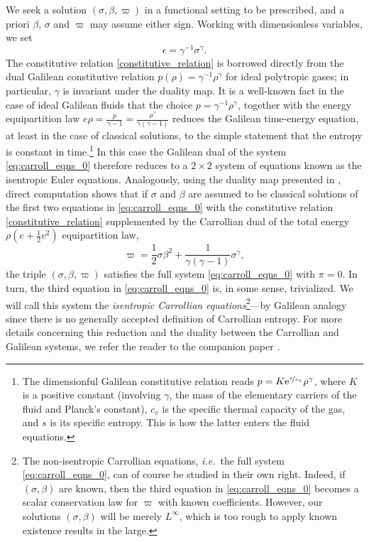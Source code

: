\documentclass[11pt,a4paper,reqno]{amsart}
\numberwithin{equation}{section}
\theoremstyle{definition}
\theoremstyle{remark}
\begin{document}
We seek a solution $(\sigma, \beta, \varpi)$ in a functional setting to be prescribed, and a priori $\beta$, $\sigma$ and $\varpi$ may assume either sign. Working with dimensionless variables, we set 
\begin{equation} \label{constitutive_relation} \epsilon = \gamma^{-1} \sigma^\gamma. \end{equation}
The constitutive relation \eqref{constitutive_relation} is borrowed directly from the dual Galilean constitutive relation 
$p(\rho) = \gamma^{-1} \rho^\gamma$ for ideal polytropic gases; in particular, $\gamma$ is invariant under the duality map. 
It is a well-known fact in the case of ideal Galilean fluids that the choice $p = \gamma^{-1} \rho^\gamma$, together with the energy equipartition law $e\rho =\frac{p}{\gamma-1}=\frac{\rho^\gamma}{\gamma(\gamma-1)}$ reduces the Galilean time-energy equation, at least in the case of classical solutions, to the simple statement that the entropy is constant in time.\footnote{The dimensionful Galilean constitutive relation reads $p  = K \text{e}^{\nicefrac{s}{c_v}} \rho^\gamma$, where $K$ is a positive constant (involving $\gamma $, the mass of the elementary carriers of the fluid and Planck's constant), $c_v$ is the specific thermal capacity of the gas, and $s $ is its specific entropy. This is how the latter enters the fluid equations.} In this case the Galilean dual of the system \eqref{eq:carroll_eqns_0} therefore reduces to a $2 \times 2$ system of equations known as the isentropic Euler equations. Analogously, using the duality map presented in \cite{AthanasiouPetropoulosSchulzTaujanskas24a}, direct computation shows that if $\sigma$ and $\beta$ are assumed to be classical solutions of the first two equations in \eqref{eq:carroll_eqns_0} with the constitutive relation \eqref{constitutive_relation} 
supplemented by the Carrollian dual of the total energy $\rho\left(e+\frac{1}{2}v^2\right)$ equipartition law,
\begin{equation*}
    \varpi = \frac{1}{2}\sigma\beta^2 + \frac{1}{\gamma(\gamma-1)}\sigma^\gamma, 
\end{equation*}
the triple $(\sigma,\beta,\varpi)$ satisfies the full system \eqref{eq:carroll_eqns_0} with $\pi=0$. In turn, the third equation in \eqref{eq:carroll_eqns_0} is, in some sense, trivialized. We will call this system the \emph{isentropic Carrollian equations}\footnote{The non-isentropic Carrollian equations, \textit{i.e.}~the full system \eqref{eq:carroll_eqns_0}, can of course be studied in their own right. Indeed, if $(\sigma, \beta)$ are known, then the third equation in \eqref{eq:carroll_eqns_0} becomes a scalar conservation law for $\varpi$ with known coefficients. However, our solutions $(\sigma, \beta)$ will be merely $L^\infty$, which is too rough to apply known existence results \cite{BouchutJames1998,Ambrosio} in the large.}---by Galilean analogy since there is no generally accepted definition of Carrollian entropy.
For more details concerning this reduction and the duality between the Carrollian and Galilean systems, we refer the reader to the companion paper \cite[\S 2]{AthanasiouPetropoulosSchulzTaujanskas24b}. 
\end{document}
